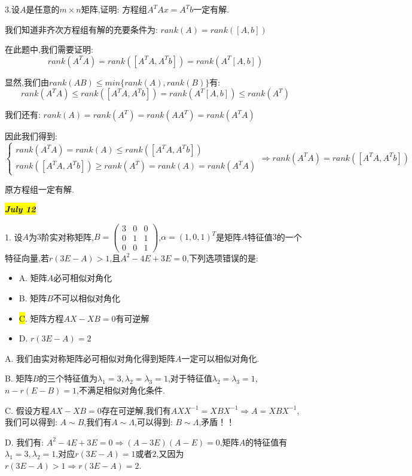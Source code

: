 3.设$A$是任意的$m\times n$矩阵,证明: $\text{方程组}A^{T}Ax=A^{T}b$一定有解.
\begin{solution}
	
	我们知道非齐次方程组有解的充要条件为: $rank(A)=rank([A,b])$
	
	在此题中,我们需要证明: $$rank(A^TA)=rank([A^TA,A^Tb])=rank(A^T[A,b])$$
	
	显然,我们由$rank(AB)\leq min\{rank(A),rank(B)\}$有: 
	$$rank(A^TA)\leq rank([A^TA,A^Tb])=rank(A^T[A,b])\leq rank(A^T)$$
	
	我们还有: $rank(A)=rank(A^T)=rank(AA^T)=rank(A^TA)$
	
	因此我们得到: 
	$$\left\lbrace
	\begin{array}{l}
		rank(A^TA)=rank(A)\leq rank([A^TA,A^Tb])\\
		rank([A^TA,A^Tb])\geq rank(A^T)=rank(A)=rank(A^TA)
	\end{array}
	\right. \Rightarrow rank(A^TA)=rank([A^TA,A^Tb])$$
	
	原方程组一定有解.
\end{solution}

\hl{\textbf{\textit{July 12}}}

1. 设$A$为$3$阶实对称矩阵,$B=\left( \begin{matrix}
	3&0&0\\0&1&1\\0&0&1
\end{matrix}\right) $,$\alpha=(1,0,1)^{T}$是矩阵$A$特征值$3$的一个特征向量,若$r(3E-A)>1$,且$A^2-4E+3E=0$,下列选项错误的是: 
\begin{itemize}
	\item A. 矩阵$A$必可相似对角化
	\item B. 矩阵$B$不可以相似对角化
	\item \hl{C}. 矩阵方程$AX-XB=0$有可逆解
	\item D. $r(3E-A)=2$
\end{itemize}
\begin{solution}
	
	A. 我们由实对称矩阵必可相似对角化得到矩阵$A$一定可以相似对角化.
	
	B. 矩阵$B$的三个特征值为$\lambda_{1}=3,\lambda_{2}=\lambda_{3}=1$,对于特征值$\lambda_{2}=\lambda_{3}=1$,$n-r(E-B)=1$,不满足相似对角化条件.
	
	C. 假设方程$AX-XB=0$存在可逆解,我们有$AXX^{-1}=XBX^{-1}\Rightarrow A=XBX^{-1}$,我们可以得到: $A\sim B$,我们有$A\sim\varLambda$,可以得到: $B\sim\varLambda$,矛盾！！
	
	D. 我们有: $A^2-4E+3E=0\Rightarrow (A-3E)(A-E)=0$,矩阵$A$的特征值有$\lambda_{1}=3,\lambda_{2}=1$,对应$r(3E-A)=1\text{或者}2$,又因为$r(3E-A)>1\Rightarrow r(3E-A)=2$.
\end{solution}

